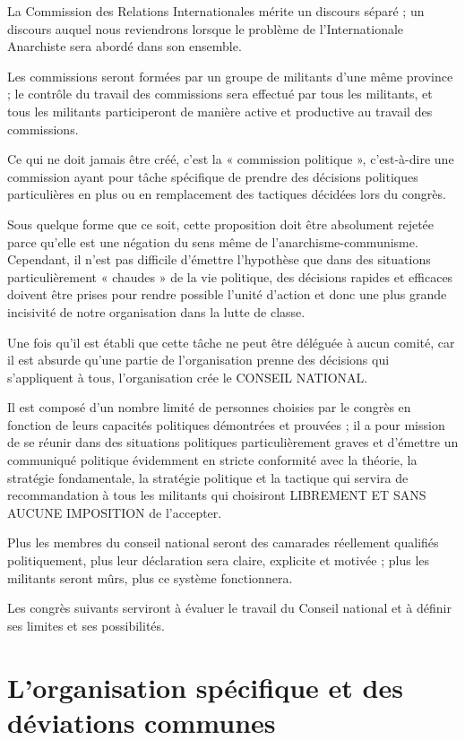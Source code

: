 La Commission des Relations Internationales mérite un discours séparé ; un discours auquel nous reviendrons lorsque le problème de l'Internationale Anarchiste sera abordé dans son ensemble.

Les commissions seront formées par un groupe de militants d'une même province ; le contrôle du travail des commissions sera effectué par tous les militants, et tous les militants participeront de manière active et productive au travail des commissions.

Ce qui ne doit jamais être créé, c'est la « commission politique », c'est-à-dire une commission ayant pour tâche spécifique de prendre des décisions politiques particulières en plus ou en remplacement des tactiques décidées lors du congrès.

Sous quelque forme que ce soit, cette proposition doit être absolument rejetée parce qu'elle est une négation du sens même de l'anarchisme-communisme. Cependant, il n'est pas difficile d'émettre l'hypothèse que dans des situations particulièrement « chaudes » de la vie politique, des décisions rapides et efficaces doivent être prises pour rendre possible l'unité d'action et donc une plus grande incisivité de notre organisation dans la lutte de classe.

Une fois qu'il est établi que cette tâche ne peut être déléguée à aucun comité, car il est absurde qu'une partie de l'organisation prenne des décisions qui s'appliquent à tous, l'organisation crée le CONSEIL NATIONAL.

Il est composé d'un nombre limité de personnes choisies par le congrès en fonction de leurs capacités politiques démontrées et prouvées ; il a pour mission de se réunir dans des situations politiques particulièrement graves et d'émettre un communiqué politique évidemment en stricte conformité avec la théorie, la stratégie fondamentale, la stratégie politique et la tactique qui servira de recommandation à tous les militants qui choisiront LIBREMENT ET SANS AUCUNE IMPOSITION de l'accepter.

Plus les membres du conseil national seront des camarades réellement qualifiés politiquement, plus leur déclaration sera claire, explicite et motivée ; plus les militants seront mûrs, plus ce système fonctionnera.

Les congrès suivants serviront à évaluer le travail du Conseil national et à définir ses limites et ses possibilités.

\chapter{L'organisation spécifique et des déviations communes}


